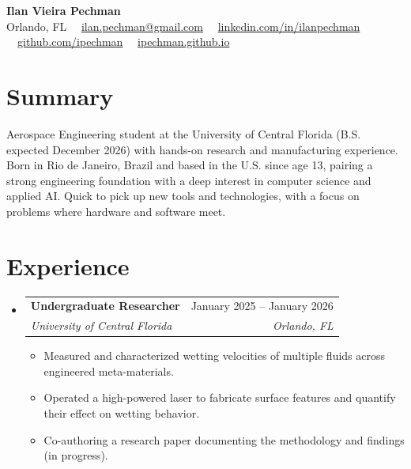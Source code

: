 \documentclass[10pt, letterpaper]{article}
\makeatletter
\newcommand{\resumeItem}[1]{\item\small{#1}}
\newcommand{\resumeExp}[4]{
  \item
  \begin{tabular*}{\textwidth}[t]{l@{\extracolsep{\fill}}r}
    \textbf{\color{accent}#1} & {\small #2} \\
    \textit{\small #3} & \textit{\small #4} \\
  \end{tabular*}\vspace{-5pt}
}
\makeatother
\begin{document}
\color{darktext}

\begin{center}
  {\Huge \textbf{\color{accent}Ilan Vieira Pechman}} \\ \vspace{6pt}
  \small \color{accent}
  Orlando, FL \ \textbullet\ \href{mailto:ilan.pechman@gmail.com}{ilan.pechman@gmail.com} \ \textbullet\ \href{https://www.linkedin.com/in/ilanpechman}{linkedin.com/in/ilanpechman} \ \textbullet\ \href{https://github.com/ipechman}{github.com/ipechman} \ \textbullet\ \href{https://ipechman.github.io}{ipechman.github.io}
\end{center}

\section{Summary}
\small Aerospace Engineering student at the University of Central Florida (B.S. expected December 2026) with hands-on research and manufacturing experience. Born in Rio de Janeiro, Brazil and based in the U.S. since age 13, pairing a strong engineering foundation with a deep interest in computer science and applied AI. Quick to pick up new tools and technologies, with a focus on problems where hardware and software meet.

\section{Experience}
\begin{itemize}[leftmargin=0.15in, label={}, itemsep=3pt]
  \resumeExp{Undergraduate Researcher}{January 2025 -- January 2026}{University of Central Florida}{Orlando, FL}
  \begin{itemize}[leftmargin=0.2in, label={\textbullet}, topsep=2pt, itemsep=1pt]
    \resumeItem{Measured and characterized wetting velocities of multiple fluids across engineered meta-materials.}
    \resumeItem{Operated a high-powered laser to fabricate surface features and quantify their effect on wetting behavior.}
    \resumeItem{Co-authoring a research paper documenting the methodology and findings (in progress).}
  \end{itemize}
\end{itemize}

\end{document}
